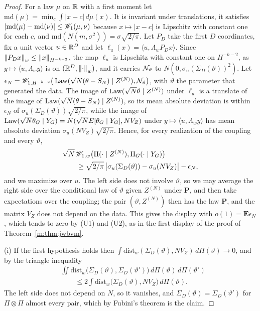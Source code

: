 \begin{proof}
For a law $\mu$ on $\mathbb{R}$ with a first moment let $\mathrm{md}(\mu)=\min_c\int|x-c|\,d\mu(x)$. It is invariant under translations, it satisfies $|\mathrm{md}(\mu)-\mathrm{md}(\nu)|\le\mathscr{W}_1(\mu,\nu)$ because $x\mapsto|x-c|$ is Lipschitz with constant one for each $c$, and $\mathrm{md}(N(m,\sigma^2))=\sigma\sqrt{2/\pi}$. Let $P_D$ take the first $D$ coordinates, fix a unit vector $u\in\mathbb{R}^D$ and let $\ell_u(x)=\langle u,\Lambda_wP_Dx\rangle$. Since $\left\|P_Dx\right\|_w\le\left\|x\right\|_{H^{-k-2}}$, the map $\ell_u$ is Lipschitz with constant one on $H^{-k-2}$, as $y\mapsto\langle u,\Lambda_wy\rangle$ is on $(\mathbb{R}^D,\left\|\cdot\right\|_w)$, and it carries $\mathcal{N}_\vartheta$ to $N(0,\sigma_u(\Sigma_D(\vartheta))^2)$. Let $\epsilon_N=\mathscr{W}_{1,H^{-k-2}}\big(\operatorname{Law}(\sqrt N(\theta-S_N)\mid Z^{(N)}),\mathcal{N}_\vartheta\big)$, with $\vartheta$ the parameter that generated the data. The image of $\operatorname{Law}(\sqrt N\theta\mid Z^{(N)})$ under $\ell_u$ is a translate of the image of $\operatorname{Law}(\sqrt N(\theta-S_N)\mid Z^{(N)})$, so its mean absolute deviation is within $\epsilon_N$ of $\sigma_u(\Sigma_D(\vartheta))\sqrt{2/\pi}$, while the image of $\operatorname{Law}(\sqrt N\theta_G\mid Y_G)=N(\sqrt NE[\theta_G\mid Y_G],NV_Z)$ under $y\mapsto\langle u,\Lambda_wy\rangle$ has mean absolute deviation $\sigma_u(NV_Z)\sqrt{2/\pi}$. Hence, for every realization of the coupling and every $\vartheta$,
\[
\begin{aligned}
&\sqrt N\,\mathscr{W}_{1,w}\big(\Pi(\cdot\mid Z^{(N)}),\Pi_G(\cdot\mid Y_G)\big)\\
&\qquad\ge\sqrt{2/\pi}\,\big|\sigma_u(\Sigma_D(\vartheta))-\sigma_u(NV_Z)\big|-\epsilon_N ,
\end{aligned}
\]
and we maximize over $u$. The left side does not involve $\vartheta$, so we may average the right side over the conditional law of $\vartheta$ given $Z^{(N)}$ under $\mathbf P$, and then take expectations over the coupling; the pair $(\vartheta,Z^{(N)})$ then has the law $\mathbf P$, and the matrix $V_Z$ does not depend on the data. This gives the display with $o(1)=\mathbf E\epsilon_N$, which tends to zero by (U1) and (U2), as in the first display of the proof of Theorem~\ref{m:thm:jwbvm}.

(i) If the first hypothesis holds then $\int\mathrm{dist}_w(\Sigma_D(\vartheta),NV_Z)\,d\Pi(\vartheta)\to0$, and by the triangle inequality
\[
\begin{aligned}
&\iint\mathrm{dist}_w\big(\Sigma_D(\vartheta),\Sigma_D(\vartheta')\big)\,d\Pi(\vartheta)\,d\Pi(\vartheta')\\
&\qquad\le2\int\mathrm{dist}_w\big(\Sigma_D(\vartheta),NV_Z\big)\,d\Pi(\vartheta) .
\end{aligned}
\]
The left side does not depend on $N$, so it vanishes, and $\Sigma_D(\vartheta)=\Sigma_D(\vartheta')$ for $\Pi\otimes\Pi$ almost every pair, which by Fubini's theorem is the claim.


\end{proof}
